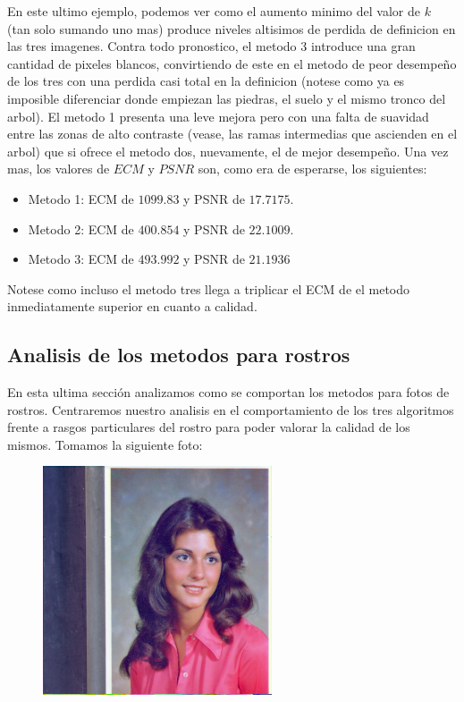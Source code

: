 En este ultimo ejemplo, podemos ver como el aumento minimo del valor de $k$ (tan solo sumando uno mas) produce niveles altisimos de perdida de definicion en las tres imagenes. Contra todo pronostico, el metodo 3 introduce una gran cantidad de pixeles blancos, convirtiendo de este en el metodo de peor desempeño de los tres con una perdida casi total en la definicion (notese como ya es imposible diferenciar donde empiezan las piedras, el suelo y el mismo tronco del arbol). El metodo 1 presenta una leve mejora pero con una falta de suavidad entre las zonas de alto contraste (vease, las ramas intermedias que ascienden en el arbol) que si ofrece el metodo dos, nuevamente, el de mejor desempeño.
Una vez mas, los valores de $ECM$ y $PSNR$ son, como era de esperarse, los siguientes:
\begin{itemize}
 \item Metodo 1: ECM de $1099.83$ y PSNR de $17.7175$.
 \item Metodo 2: ECM de $400.854$ y PSNR de $22.1009$.
 \item Metodo 3: ECM de $493.992$ y PSNR de $21.1936$
\end{itemize}
Notese como incluso el metodo tres llega a triplicar el ECM de el metodo inmediatamente superior en cuanto a calidad.

\subsection{Analisis de los metodos para rostros}

En esta ultima sección analizamos como se comportan los metodos para fotos de rostros. Centraremos nuestro analisis en el comportamiento de los tres algoritmos frente a rasgos particulares del rostro para poder valorar la calidad de los mismos. Tomamos la siguiente foto:

\begin{figure}[H]
\centering
\includegraphics[scale=0.50]{fotos/rostro/orig.png}
\end{figure}

